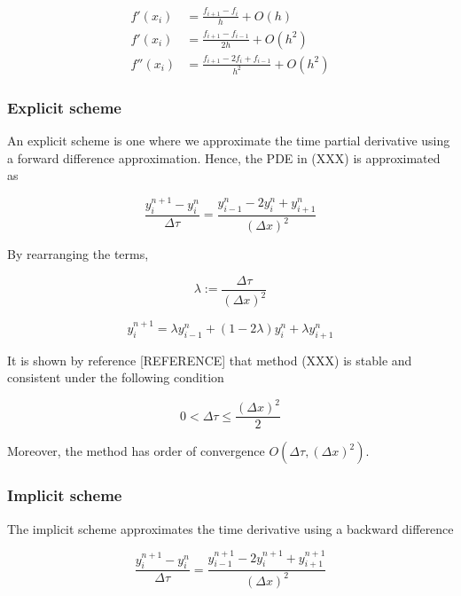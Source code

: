 \begin{align}
  f'(x_i) &= \frac{f_{i+1} - f_{i}}{h} + O(h) \\
  f'(x_i) &= \frac{f_{i+1} - f_{i-1}}{2h} + O(h^2) \\
  f''(x_i) &= \frac{f_{i+1} - 2f_{i} + f_{i-1}}{h^2} + O(h^2)
\end{align}

\subsubsection{Explicit scheme}

An explicit scheme is one where we approximate the time partial derivative using
a forward difference approximation. Hence, the PDE in (XXX) is approximated as

\begin{equation}
  \frac{y^{n+1}_{i} - y^{n}_{i}}{\Delta \tau} = \frac{y^{n}_{i-1} - 2y^{n}_{i} + y^{n}_{i+1}}{(\Delta x)^2}
\end{equation}

By rearranging the terms,

\begin{equation}
  \lambda := \frac{\Delta \tau}{(\Delta x)^2}
\end{equation}

\begin{equation}
  y^{n+1}_i = \lambda y^{n}_{i-1} + (1 - 2\lambda)y^{n}_{i} + \lambda y^{n}_{i+1}
\end{equation}

It is shown by reference [REFERENCE] that method (XXX) is stable and consistent 
under the following condition

\begin{equation}
  0 < \Delta \tau \le \frac{(\Delta x)^2}{2}
\end{equation}

Moreover, the method has order of convergence $O(\Delta \tau, (\Delta x)^{2})$.

\subsubsection{Implicit scheme}

The implicit scheme approximates the time derivative using a backward difference

\begin{equation}
  \frac{y^{n+1}_{i} - y^{n}_{i}}{\Delta \tau} = \frac{y^{n+1}_{i-1} - 2y^{n+1}_{i} + y^{n+1}_{i+1}}{(\Delta x)^2}
\end{equation}

